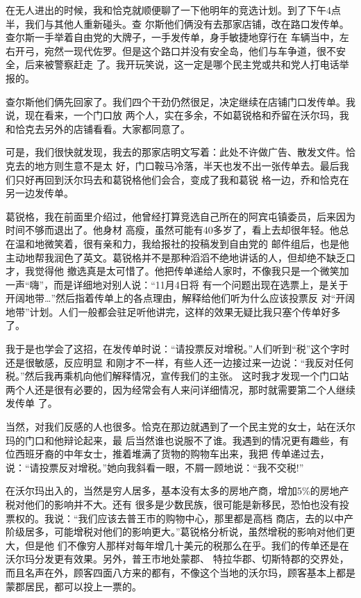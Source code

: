 ﻿\documentclass[11pt]{article}
\begin{document}
在无人进出的时候，我和恰克就顺便聊了一下他明年的竞选计划。到了下午4点半，我们与其他人重新碰头。查
尔斯他们俩没有去那家店铺，改在路口发传单。查尔斯一手举着自由党的大牌子，一手发传单，身手敏捷地穿行在
车辆当中，左右开弓，宛然一现代佐罗。但是这个路口并没有安全岛，他们与车争道，很不安全，后来被警察赶走
了。我开玩笑说，这一定是哪个民主党或共和党人打电话举报的。

查尔斯他们俩先回家了。我们四个干劲仍然很足，决定继续在店铺门口发传单。我说，现在看来，一个门口放
两个人，实在多余，不如葛锐格和乔留在沃尔玛，我和恰克去另外的店铺看看。大家都同意了。

可是，我们很快就发现，我去的那家店明文写着：此处不许做广告、散发文件。恰克去的地方则生意不是太
好，门口鞍马冷落，半天也发不出一张传单去。最后我们只好再回到沃尔玛去和葛锐格他们会合，变成了我和葛锐
格一边，乔和恰克在另一边发传单。

葛锐格，我在前面里介绍过，他曾经打算竞选自己所在的阿宾屯镇委员，后来因为时间不够而退出了。他身材
高瘦，虽然可能有40多岁了，看上去却很年轻。他总在温和地微笑着，很有亲和力，我给报社的投稿发到自由党的
邮件组后，也是他主动地帮我润色了英文。葛锐格并不是那种滔滔不绝地讲话的人，但却绝不缺乏口才，我觉得他
撤选真是太可惜了。他把传单递给人家时，不像我只是一个微笑加一声``嗨''，而是详细地对别人说：``11月4日将
有一个问题出现在选票上，是关于开阔地带\ldots ''然后指着传单上的各点理由，解释给他们听为什么应该投票反
对``开阔地带''计划。人们一般都会驻足听他讲完，这样的效果无疑比我只塞个传单好多了。

我于是也学会了这招，在发传单时说：``请投票反对增税。''人们听到``税''这个字时还是很敏感，反应明显
和刚才不一样，有些人还一边接过来一边说：``我反对任何税。''然后我再乘机向他们解释情况，宣传我们的主张。
这时我才发现一个门口站两个人还是很有必要的，因为经常会有人来问详细情况，那时就需要第二个人继续发传单
了。

当然，对我们反感的人也很多。恰克在那边就遇到了一个民主党的女士，站在沃尔玛的门口和他辩论起来，最
后当然谁也说服不了谁。我遇到的情况更有趣些，有位西班牙裔的中年女士，推着堆满了货物的购物车出来，我把
传单递过去，说：``请投票反对增税。''她向我斜看一眼，不屑一顾地说：``我不交税!''

在沃尔玛出入的，当然是穷人居多，基本没有太多的房地产商，增加5\%的房地产税对他们的影响并不大。还有
很多是少数民族，很可能是新移民，恐怕也没有投票权的。我说：``我们应该去普王市的购物中心，那里都是高档
商店，去的以中产阶级居多，可能增税对他们的影响更大。''葛锐格分析说，虽然增税的影响对他们更大，但是他
们不像穷人那样对每年增几十美元的税那么在乎。我们的传单还是在沃尔玛分发更有效果。另外，普王市地处蒙郡、
特拉华郡、切斯特郡的交界处，而且名声在外，顾客四面八方来的都有，不像这个当地的沃尔玛，顾客基本上都是
蒙郡居民，都可以投上一票的。
\end{document}
